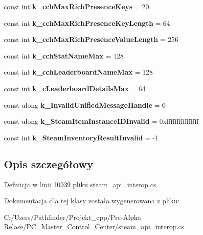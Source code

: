 \begin{DoxyCompactItemize}
const int {\bfseries k\+\_\+cch\+Max\+Rich\+Presence\+Keys} = 20
\item 
\mbox{\label{class_valve_1_1_steamworks_1_1_steam_a_p_i_a31bd97a23c17ba5bc2bb274abe9a5d17}} 
const int {\bfseries k\+\_\+cch\+Max\+Rich\+Presence\+Key\+Length} = 64
\item 
\mbox{\label{class_valve_1_1_steamworks_1_1_steam_a_p_i_a2e5895c2f94c5acd42bb4fc26e71ed27}} 
const int {\bfseries k\+\_\+cch\+Max\+Rich\+Presence\+Value\+Length} = 256
\item 
\mbox{\label{class_valve_1_1_steamworks_1_1_steam_a_p_i_aa30863f7c8e911a27d7a7600c33c2eb3}} 
const int {\bfseries k\+\_\+cch\+Stat\+Name\+Max} = 128
\item 
\mbox{\label{class_valve_1_1_steamworks_1_1_steam_a_p_i_a67644139d5785d3b0d81d3b59ea4c852}} 
const int {\bfseries k\+\_\+cch\+Leaderboard\+Name\+Max} = 128
\item 
\mbox{\label{class_valve_1_1_steamworks_1_1_steam_a_p_i_ae1f4d20251ef51a5277e7bd2ec0cfec5}} 
const int {\bfseries k\+\_\+c\+Leaderboard\+Details\+Max} = 64
\item 
\mbox{\label{class_valve_1_1_steamworks_1_1_steam_a_p_i_ad3974b8c0f3cbae93105cb5f0feaee53}} 
const ulong {\bfseries k\+\_\+\+Invalid\+Unified\+Message\+Handle} = 0
\item 
\mbox{\label{class_valve_1_1_steamworks_1_1_steam_a_p_i_a378dce810bc84ca5ba2cb984b0e444c7}} 
const ulong {\bfseries k\+\_\+\+Steam\+Item\+Instance\+I\+D\+Invalid} = 0xffffffffffffffff
\item 
\mbox{\label{class_valve_1_1_steamworks_1_1_steam_a_p_i_a02a95d8c7afa704179b4e777a25ab3e3}} 
const int {\bfseries k\+\_\+\+Steam\+Inventory\+Result\+Invalid} = -\/1
\end{DoxyCompactItemize}


\subsection{Opis szczegółowy}


Definicja w linii 10939 pliku steam\+\_\+api\+\_\+interop.\+cs.



Dokumentacja dla tej klasy została wygenerowana z pliku\+:\begin{DoxyCompactItemize}
\item 
C\+:/\+Users/\+Pathfinder/\+Projekt\+\_\+cpp/\+Pre-\/\+Alpha Relase/\+P\+C\+\_\+\+Master\+\_\+\+Control\+\_\+\+Center/steam\+\_\+api\+\_\+interop.\+cs\end{DoxyCompactItemize}
